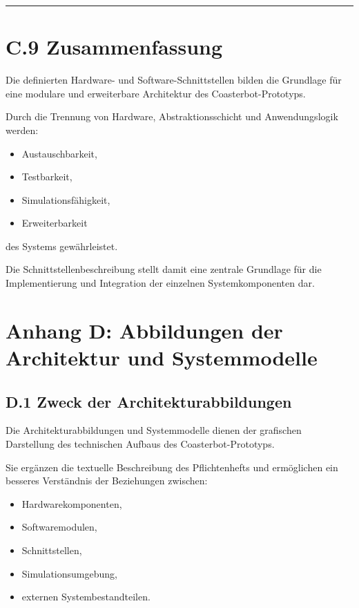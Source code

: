 \documentclass[
]{article}
\providecommand{\tightlist}{%
  \setlength{\itemsep}{0pt}\setlength{\parskip}{0pt}}
\begin{document}
\begin{center}\rule{0.5\linewidth}{0.5pt}\end{center}

\section{C.9 Zusammenfassung}\label{c.9-zusammenfassung}

Die definierten Hardware- und Software-Schnittstellen bilden die
Grundlage für eine modulare und erweiterbare Architektur des
Coasterbot-Prototyps.

Durch die Trennung von Hardware, Abstraktionsschicht und Anwendungslogik
werden:

\begin{itemize}
\tightlist
\item
  Austauschbarkeit,
\item
  Testbarkeit,
\item
  Simulationsfähigkeit,
\item
  Erweiterbarkeit
\end{itemize}

des Systems gewährleistet.

Die Schnittstellenbeschreibung stellt damit eine zentrale Grundlage für
die Implementierung und Integration der einzelnen Systemkomponenten dar.

\section{Anhang D: Abbildungen der Architektur und
Systemmodelle}\label{anhang-d-abbildungen-der-architektur-und-systemmodelle}

\subsection{D.1 Zweck der
Architekturabbildungen}\label{d.1-zweck-der-architekturabbildungen}

Die Architekturabbildungen und Systemmodelle dienen der grafischen
Darstellung des technischen Aufbaus des Coasterbot-Prototyps.

Sie ergänzen die textuelle Beschreibung des Pflichtenhefts und
ermöglichen ein besseres Verständnis der Beziehungen zwischen:

\begin{itemize}
\tightlist
\item
  Hardwarekomponenten,
\item
  Softwaremodulen,
\item
  Schnittstellen,
\item
  Simulationsumgebung,
\item
  externen Systembestandteilen.
\end{itemize}
\end{document}
